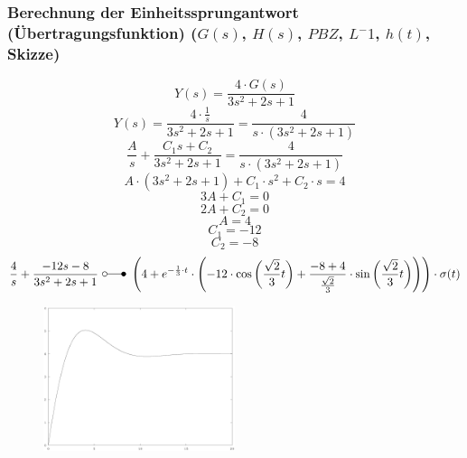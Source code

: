 \documentclass[a4paper,10pt,fleqn]{article}
\begin{document}
\subsubsection*{Berechnung der Einheitssprungantwort (Übertragungsfunktion) ($G(s)$, $H(s)$, $PBZ$, $L^-1$, $h(t)$, Skizze)}
\[ Y(s) = \frac{4 \cdot G(s)}{3 s^2 + 2 s + 1} \]
\[ Y(s) = \frac{4 \cdot \frac{1}{s}}{3 s^2 + 2 s + 1} = \frac{4}{s \cdot (3 s^2 + 2 s + 1)} \]
\[ \frac{A}{s} + \frac{C_1 s + C_2}{3 s^2 + 2 s + 1} = \frac{4}{s \cdot (3 s^2 + 2 s + 1)} \]
\[ A \cdot (3 s^2 + 2 s + 1) + C_1 \cdot s^2 + C_2 \cdot s = 4 \]
\[ 3 A + C_1 = 0 \]
\[ 2 A + C_2 = 0 \]
\[ A = 4 \]
\[ C_1 = -12 \]
\[ C_2 = -8 \]
\[ \frac{4}{s} + \frac{- 12 s - 8}{3 s^2 + 2 s + 1} ~ \laplace ~ 
\left(4 + e^{-\frac{1}{3} \cdot t} \cdot \left(- 12 \cdot \cos\left(\frac{\sqrt{2}}{3} t\right) + \frac{-8 + 4}{\frac{\sqrt{2}}{3}} \cdot \sin\left(\frac{\sqrt{2}}{3} t\right) \right)\right) \cdot \sigma(t) \]
\begin{figure}[h!]
    \centering
    \includegraphics[width=0.5\textwidth]{sprung.eps}
\end{figure}
\end{document}
